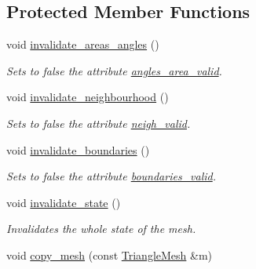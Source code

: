 \subsection*{Protected Member Functions}
\begin{DoxyCompactItemize}
\item 
\mbox{\label{classgeoproc_1_1TriangleMesh_aace37defd7566fed311222b7e22264a5}} 
void \hyperlink{classgeoproc_1_1TriangleMesh_aace37defd7566fed311222b7e22264a5}{invalidate\+\_\+areas\+\_\+angles} ()
\begin{DoxyCompactList}\small\item\em Sets to false the attribute \hyperlink{classgeoproc_1_1TriangleMesh_a046a6679ae404e02ae40d4d4d798b6f6}{angles\+\_\+area\+\_\+valid}. \end{DoxyCompactList}\item 
\mbox{\label{classgeoproc_1_1TriangleMesh_add9ebc58773a0127b9a0467d33cfe3c6}} 
void \hyperlink{classgeoproc_1_1TriangleMesh_add9ebc58773a0127b9a0467d33cfe3c6}{invalidate\+\_\+neighbourhood} ()
\begin{DoxyCompactList}\small\item\em Sets to false the attribute \hyperlink{classgeoproc_1_1TriangleMesh_a21205ec88e494f864db4d8247db70d3c}{neigh\+\_\+valid}. \end{DoxyCompactList}\item 
\mbox{\label{classgeoproc_1_1TriangleMesh_af8c9c5ef993c961f24cdf189a990e6e8}} 
void \hyperlink{classgeoproc_1_1TriangleMesh_af8c9c5ef993c961f24cdf189a990e6e8}{invalidate\+\_\+boundaries} ()
\begin{DoxyCompactList}\small\item\em Sets to false the attribute \hyperlink{classgeoproc_1_1TriangleMesh_a1384fa834aaa4ec3dc7c3b025b1ca528}{boundaries\+\_\+valid}. \end{DoxyCompactList}\item 
void \hyperlink{classgeoproc_1_1TriangleMesh_af83d7e4da9103a2d4ce965955b4520f7}{invalidate\+\_\+state} ()
\begin{DoxyCompactList}\small\item\em Invalidates the whole state of the mesh. \end{DoxyCompactList}\item 
void \hyperlink{classgeoproc_1_1TriangleMesh_a1680c786572ac504621f253b7407d4f7}{copy\+\_\+mesh} (const \hyperlink{classgeoproc_1_1TriangleMesh}{Triangle\+Mesh} \&m)

\end{DoxyCompactItemize}
